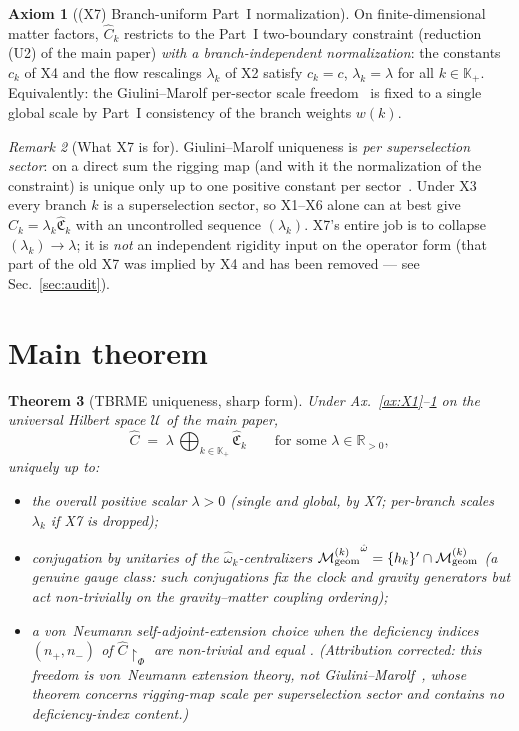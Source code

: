 \documentclass[11pt,a4paper]{article}
\newtheorem{theorem}{Theorem}[section]
\theoremstyle{definition}
\newtheorem{axiom}[theorem]{Axiom}
\theoremstyle{remark}
\newtheorem{remark}[theorem]{Remark}
\newcommand{\MM}{\mathcal{M}}
\newcommand{\RR}{\mathbb{R}}
\newcommand{\KK}{\mathbb{K}}
\newcommand{\ctr}[1]{{#1}^{\hat\omega}}
\begin{document}
\begin{axiom}[(X7) Branch-uniform Part~I
normalization]\label{ax:X7}
On finite-dimensional matter factors, $\widehat C_k$ restricts
to the Part~I two-boundary constraint (reduction (U2) of the
main paper) \emph{with a branch-independent normalization}:
the constants $c_k$ of X4 and the flow rescalings $\lambda_k$
of X2 satisfy $c_k=c$, $\lambda_k=\lambda$ for all
$k\in\KK_+$. Equivalently: the Giulini--Marolf per-sector
scale freedom~\cite{GiuliniMarolf1999} is fixed to a single
global scale by Part~I consistency of the branch weights
$w(k)$.
\end{axiom}

\begin{remark}[What X7 is for]\label{rem:X7-role}
Giulini--Marolf uniqueness is \emph{per superselection
sector}: on a direct sum the rigging map (and with it the
normalization of the constraint) is unique only up to one
positive constant per sector~\cite{GiuliniMarolf1999}. Under
X3 every branch $k$ is a superselection sector, so X1--X6
alone can at best give $\widehat C_k=\lambda_k\widehat{
\mathfrak C}_k$ with an uncontrolled sequence $(\lambda_k)$.
X7's entire job is to collapse $(\lambda_k)\to\lambda$; it is
\emph{not} an independent rigidity input on the operator form
(that part of the old X7 was implied by X4 and has been
removed --- see Sec.~\ref{sec:audit}).
\end{remark}

\section{Main theorem}
\label{sec:main-theorem}

\begin{theorem}[TBRME uniqueness, sharp form]\label{thm:main}
Under Ax.~\ref{ax:X1}--\ref{ax:X7} on the universal Hilbert
space $\mathcal U$ of the main paper,
\[
  \widehat C\;=\;\lambda\,\bigoplus_{k\in\KK_+}
  \widehat{\mathfrak C}_k
  \qquad\text{for some }\lambda\in\RR_{>0},
\]
uniquely up to:
\begin{itemize}[leftmargin=*,nosep]
  \item[(\textbf{a})] the overall positive scalar $\lambda>0$
    (single and global, by X7; per-branch scales $\lambda_k$
    if X7 is dropped);
  \item[(\textbf{b})] conjugation by unitaries of the
    $\hat\omega_k$-centralizers
    $\ctr{\MM_{\rm geom}^{(k)}}=\{h_k\}'\cap\MM_{\rm geom}^{(k)}$
    (a genuine gauge class: such conjugations fix the clock and
    gravity generators but act non-trivially on the
    gravity--matter coupling ordering);
  \item[(\textbf{c})] a von~Neumann self-adjoint-extension
    choice when the deficiency indices $(n_+,n_-)$ of
    $\widehat C\!\restriction_\Phi$ are non-trivial and equal
    \cite{ReedSimonII}. \emph{(Attribution corrected: this
    freedom is von~Neumann extension theory, not
    Giulini--Marolf~\cite{GiuliniMarolf1999}, whose theorem
    concerns rigging-map scale per superselection sector and
    contains no deficiency-index content.)}
\end{itemize}
\end{theorem}
\end{document}
